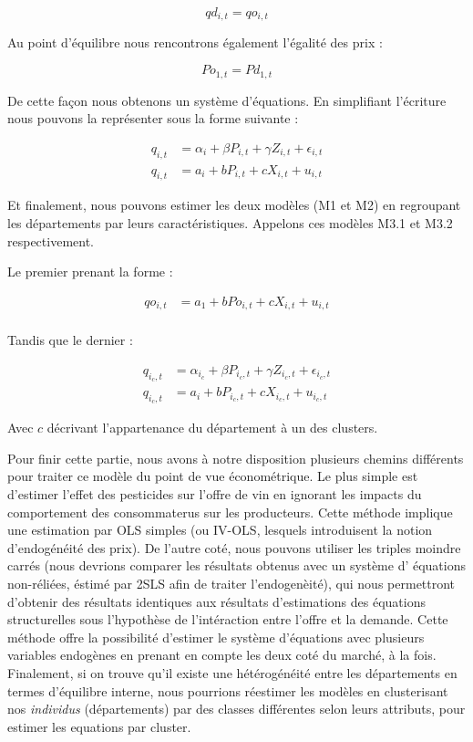 \documentclass[11pt,]{article}
\begin{document}
\begin{equation*}
  qd_{i,t} = qo_{i,t}
\end{equation*}

Au point d'équilibre nous rencontrons également l'égalité des prix :

\begin{equation*}
  Po_{1,t} = Pd_{1,t}
\end{equation*}

De cette façon nous obtenons un système d'équations. En simplifiant
l'écriture nous pouvons la représenter sous la forme suivante :

\begin{align*}
  q_{i,t} & = \alpha_{i} + \beta P_{i,t} + \gamma Z_{i,t} + \epsilon_{i,t} \\
  q_{i,t} & = a_i + b P_{i,t} + c X_{i,t} + u_{i,t}
\end{align*}

Et finalement, nous pouvons estimer les deux modèles (M1 et M2) en
regroupant les départements par leurs caractéristiques. Appelons ces
modèles M3.1 et M3.2 respectivement.

Le premier prenant la forme :

\begin{align*}
  qo_{i,t} & = a_1 + b Po_{i,t} + c X_{i,t} + u_{i,t} \\ 
\end{align*}

Tandis que le dernier :

\begin{align*}
  q_{i_{c},t} & = \alpha_{i_{c}} + \beta P_{i_{c},t} + \gamma Z_{i_{c},t} + \epsilon_{i_{c},t} \\
  q_{i_{c},t} & = a_i + b P_{i_{c},t} + c X_{i_{c},t} + u_{i_{c},t}
\end{align*}

Avec \(c\) décrivant l'appartenance du département à un des clusters.

Pour finir cette partie, nous avons à notre disposition plusieurs
chemins différents pour traiter ce modèle du point de vue économétrique.
Le plus simple est d'estimer l'effet des pesticides sur l'offre de vin
en ignorant les impacts du comportement des consommaterus sur les
producteurs. Cette méthode implique une estimation par OLS simples (ou
IV-OLS, lesquels introduisent la notion d'endogénéité des prix). De
l'autre coté, nous pouvons utiliser les triples moindre carrés (nous
devrions comparer les résultats obtenus avec un système d' équations
non-réliées, éstimé par 2SLS afin de traiter l'endogenèité), qui nous
permettront d'obtenir des résultats identiques aux résultats
d'estimations des équations structurelles sous l'hypothèse de
l'intéraction entre l'offre et la demande. Cette méthode offre la
possibilité d'estimer le système d'équations avec plusieurs variables
endogènes en prenant en compte les deux coté du marché, à la fois.
Finalement, si on trouve qu'il existe une hétérogénéité entre les
départements en termes d'équilibre interne, nous pourrions réestimer les
modèles en clusterisant nos \emph{individus} (départements) par des
classes différentes selon leurs attributs, pour estimer les equations
par cluster.
\end{document}
